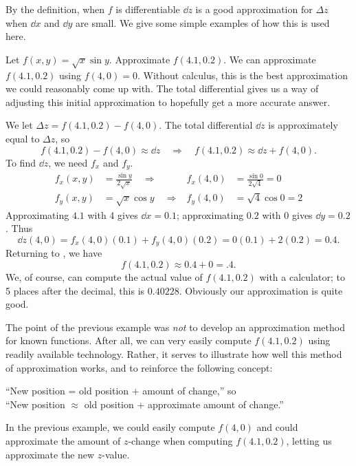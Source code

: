 By the definition, when $f$ is differentiable $\dd z$ is a good approximation for $\Delta z$ when $\dd x$ and $\dd y$ are small. We give some simple examples of how this is used here.

\begin{example}\label{ex_totaldiff2}
Let $f(x,y)=\sqrt{x}\sin y$. Approximate $f(4.1,0.2)$.
\solution
We can approximate $f(4.1,0.2)$ using $f(4,0)=0$. Without calculus, this is the best approximation we could reasonably come up with. The total differential gives us a way of adjusting this initial approximation to hopefully get a more accurate answer.

We let $\Delta z = f(4.1,0.2) - f(4,0)$. The total differential $\dd z$ is approximately equal to $\Delta z$, so
\begin{equation}
f(4.1,0.2) - f(4,0) \approx \dd z
\quad \Rightarrow \quad
f(4.1,0.2) \approx \dd z + f(4,0).\label{eq:totaldiff2}
\end{equation}
To find $\dd z$, we need $f_x$ and $f_y$.
\begin{align*}
f_x(x,y) &= \frac{\sin y}{2\sqrt{x}} \quad\Rightarrow&
f_x(4,0) &= \frac{\sin0}{2\sqrt{4}}=0 \\
f_y(x,y) &= \sqrt{x}\cos y \quad\Rightarrow&
f_y(4,0) &= \sqrt{4}\cos0=2
\end{align*}
Approximating $4.1$ with 4 gives $\dd x = 0.1$; approximating $0.2$ with $0$ gives $\dd y=0.2$. Thus
\[
\dd z(4,0) = f_x(4,0)(0.1) + f_y(4,0)(0.2)
=0(0.1) + 2(0.2)
=0.4.
\]
Returning to , we have
\[f(4.1,0.2) \approx 0.4 + 0 = .4.\]
We, of course, can compute the actual value of $f(4.1,0.2)$ with a calculator; to 5 places after the decimal, this is $0.40228$. Obviously our approximation is quite good.
\end{example}

The point of the previous example was \emph{not} to develop an approximation method for known functions. After all, we can very easily compute $f(4.1,0.2)$ using readily available technology. Rather, it serves to illustrate how well this method of approximation works, and to reinforce the following concept:
\begin{center}
	``New position = old position $+$ amount of change,'' so\\
	``New position $\approx$ old position + approximate amount of change.''
\end{center}

In the previous example, we could easily compute $f(4,0)$ and could approximate the amount of $z$-change when computing $f(4.1,0.2)$, letting us approximate the new $z$-value.

